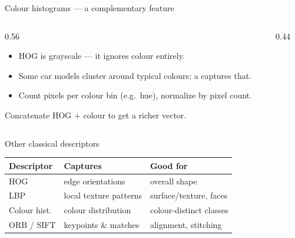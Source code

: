 \documentclass[10pt,aspectratio=169]{beamer}
\begin{document}
\begin{frame}{Colour histograms — a complementary feature}
  \begin{columns}[T]
    \begin{column}{0.56\textwidth}
      \begin{itemize}
        \item HOG is grayscale — it ignores colour entirely.
        \item Some car models cluster around typical colours; a  captures that.
        \item Count pixels per colour bin (e.g.\ hue), normalize by pixel count.
      \end{itemize}
      Concatenate HOG $+$ colour to get a richer vector.
    \end{column}
    \begin{column}{0.44\textwidth}
      \begin{center}
      \end{center}
    \end{column}
  \end{columns}
\end{frame}

\begin{frame}{Other classical descriptors}
  \begin{center}
  \begin{tabular}{@{}lll@{}}
    \toprule
    \textbf{Descriptor} & \textbf{Captures} & \textbf{Good for} \\
    \midrule
    HOG & edge orientations & overall shape \\
    LBP & local texture patterns & surface/texture, faces \\
    Colour hist. & colour distribution & colour-distinct classes \\
    ORB / SIFT & keypoints \& matches & alignment, stitching \\
    \bottomrule
  \end{tabular}
  \end{center}
\end{frame}
\end{document}
